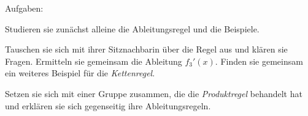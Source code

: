 \documentclass[10pt, a5paper, landscape]{scrartcl}
\begin{document}
	Aufgaben:
	\begin{enumeraten}
		\item[\Large\symEinzel] Studieren sie zunächst alleine die Ableitungsregel und die Beispiele.
		\item[\Large\symPartner] Tauschen sie sich mit ihrer Sitznachbarin über die Regel aus und klären sie Fragen. Ermitteln sie gemeinsam die Ableitung $f_3'(x)$. Finden sie gemeinsam ein weiteres Beispiel für die \emph{Kettenregel}.
		\item[\Large\symGruppe] Setzen sie sich mit einer Gruppe zusammen, die die \emph{Produktregel} behandelt hat und erklären sie sich gegenseitig ihre Ableitungsregeln.
	\end{enumeraten}
\end{document}
